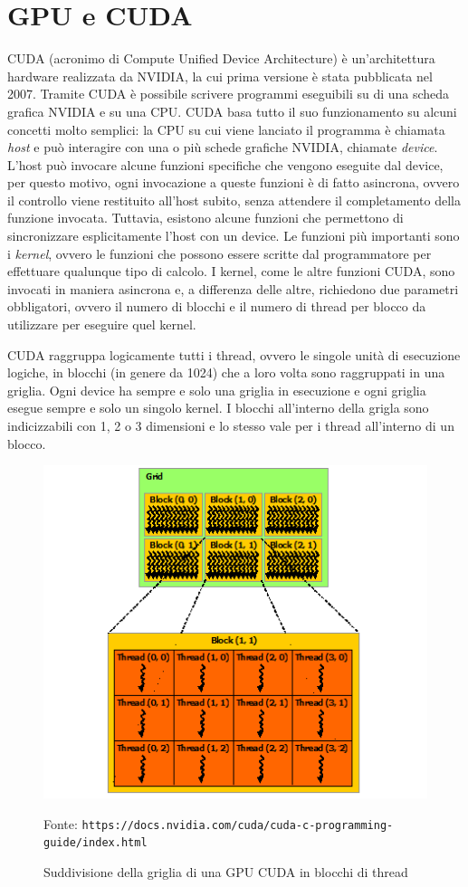 \documentclass[12pt,a4paper]{book}
\newcommand{\source}[1]{\caption*{Fonte: {\small\texttt{#1}}} }
\begin{document}
	\section{GPU e CUDA}
	CUDA (acronimo di Compute Unified Device Architecture) è un'architettura hardware realizzata da NVIDIA, la cui prima versione è stata pubblicata nel 2007. Tramite CUDA è possibile scrivere programmi eseguibili su di una scheda grafica NVIDIA e su una CPU. CUDA basa tutto il suo funzionamento su alcuni concetti molto semplici: la CPU su cui viene lanciato il programma è chiamata \textit{host} e può interagire con una o più schede grafiche NVIDIA, chiamate \textit{device}. L'host può invocare alcune funzioni specifiche che vengono eseguite dal device, per questo motivo, ogni invocazione a queste funzioni è di fatto asincrona, ovvero il controllo viene restituito all'host subito, senza attendere il completamento della funzione invocata. Tuttavia, esistono alcune funzioni che permettono di sincronizzare esplicitamente l'host con un device. Le funzioni più importanti sono i \textit{kernel}, ovvero le funzioni che possono essere scritte dal programmatore per effettuare qualunque tipo di calcolo. I kernel, come le altre funzioni CUDA, sono invocati in maniera asincrona e, a differenza delle altre, richiedono due parametri obbligatori, ovvero il numero di blocchi e il numero di thread per blocco da utilizzare per eseguire quel kernel.
	
	CUDA raggruppa logicamente tutti i thread, ovvero le singole unità di esecuzione logiche, in blocchi (in genere da 1024) che a loro volta sono raggruppati in una griglia. Ogni device ha sempre e solo una griglia in esecuzione e ogni griglia esegue sempre e solo un singolo kernel. I blocchi all'interno della grigla sono indicizzabili con 1, 2 o 3 dimensioni e lo stesso vale per i thread all'interno di un blocco.
	
	\begin{figure}[!ht]
		\centering
		\includegraphics[width=0.7\linewidth]{grid-of-thread-blocks}
		\caption[Struttura della griglia di una GPU CUDA]{Suddivisione della griglia di una GPU CUDA in blocchi di thread}
		\source{https://docs.nvidia.com/cuda/cuda-c-programming-guide/index.html}
		\label{fig:grid-of-thread-blocks}
	\end{figure}
	
\end{document}
